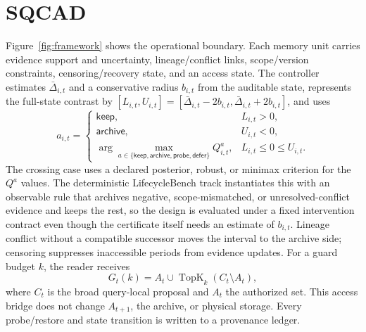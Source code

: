 \documentclass{article}
\newcommand{\keep}{\mathsf{keep}}
\newcommand{\archive}{\mathsf{archive}}
\newcommand{\probe}{\mathsf{probe}}
\newcommand{\defer}{\mathsf{defer}}
\newcommand{\SQCAD}{\textsc{SQCAD}}
\begin{document}
\section{\SQCAD}
Figure~\ref{fig:framework} shows the operational boundary. Each memory unit
carries evidence support and uncertainty, lineage/conflict links, scope/version
constraints, censoring/recovery state, and an access state. The controller
estimates $\bar\Delta_{i,t}$ and a conservative radius $b_{i,t}$ from the auditable
state, represents the full-state contrast by
$[L_{i,t},U_{i,t}]=[\bar\Delta_{i,t}-2b_{i,t},\bar\Delta_{i,t}+2b_{i,t}]$, and uses
\begin{equation}
a_{i,t}=\begin{cases}
\keep,&L_{i,t}>0,\\
\archive,&U_{i,t}<0,\\
\arg\max_{a\in\{\keep,\archive,\probe,\defer\}}Q_{i,t}^a,&L_{i,t}\le0\le U_{i,t}.
\end{cases}
\label{eq:policy}
\end{equation}
The crossing case uses a declared posterior, robust, or minimax criterion for the
$Q^a$ values. The deterministic LifecycleBench track instantiates this with an
observable rule that archives negative, scope-mismatched, or unresolved-conflict
evidence and keeps the rest, so the design is evaluated under a fixed intervention
contract even though the certificate itself needs an estimate of $b_{i,t}$.
Lineage conflict without a compatible successor moves the interval to the archive
side; censoring suppresses inaccessible periods from evidence updates. For a guard
budget $k$, the reader receives
\begin{equation}
G_t(k)=A_t\cup\operatorname{TopK}_k(C_t\setminus A_t),
\end{equation}
where $C_t$ is the broad query-local proposal and $A_t$ the authorized set. This access bridge does not change $A_{t+1}$, the archive, or physical storage. Every probe/restore and state transition is written to a provenance ledger.
\end{document}
